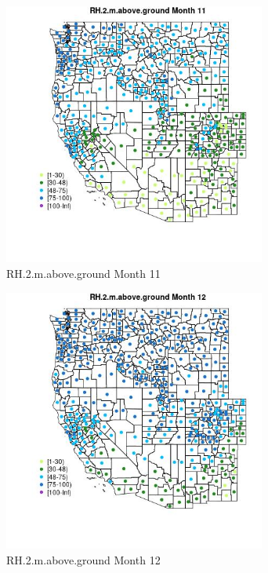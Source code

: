 \begin{figure} 
\centering  
\includegraphics[width=0.77\textwidth]{Code_Outputs/df_report_ML_predictors_CountyCentroid_Locations_Dates_2008-01-01to2018-12-31_MapObsMo11RH2maboveground.jpg} 
\caption{\label{fig:df_report_ML_predictors_CountyCentroid_Locations_Dates_2008-01-01to2018-12-31MapObsMo11RH2maboveground}RH.2.m.above.ground Month 11} 
\end{figure} 
 

\begin{figure} 
\centering  
\includegraphics[width=0.77\textwidth]{Code_Outputs/df_report_ML_predictors_CountyCentroid_Locations_Dates_2008-01-01to2018-12-31_MapObsMo12RH2maboveground.jpg} 
\caption{\label{fig:df_report_ML_predictors_CountyCentroid_Locations_Dates_2008-01-01to2018-12-31MapObsMo12RH2maboveground}RH.2.m.above.ground Month 12} 
\end{figure} 
 

